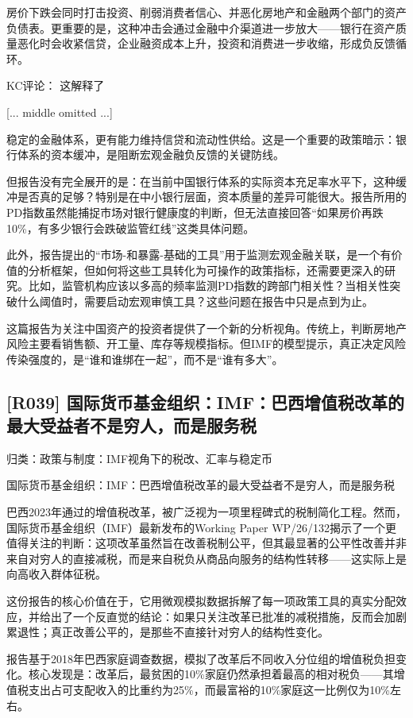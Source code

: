 \documentclass[11pt]{ctexart}
\begin{document}
房价下跌会同时打击投资、削弱消费者信心、并恶化房地产和金融两个部门的资产负债表。更重要的是，这种冲击会通过金融中介渠道进一步放大——银行在资产质量恶化时会收紧信贷，企业融资成本上升，投资和消费进一步收缩，形成负反馈循环。

KC评论： 这解释了

[... middle omitted ...]

稳定的金融体系，更有能力维持信贷和流动性供给。这是一个重要的政策暗示：银行体系的资本缓冲，是阻断宏观金融负反馈的关键防线。

但报告没有完全展开的是：在当前中国银行体系的实际资本充足率水平下，这种缓冲是否真的足够？特别是在中小银行层面，资本质量的差异可能很大。报告所用的PD指数虽然能捕捉市场对银行健康度的判断，但无法直接回答“如果房价再跌10\%，有多少银行会跌破监管红线”这类具体问题。

此外，报告提出的“市场-和暴露-基础的工具”用于监测宏观金融关联，是一个有价值的分析框架，但如何将这些工具转化为可操作的政策指标，还需要更深入的研究。比如，监管机构应该以多高的频率监测PD指数的跨部门相关性？当相关性突破什么阈值时，需要启动宏观审慎工具？这些问题在报告中只是点到为止。

这篇报告为关注中国资产的投资者提供了一个新的分析视角。传统上，判断房地产风险主要看销售额、开工量、库存等规模指标。但IMF的模型提示，真正决定风险传染强度的，是“谁和谁绑在一起”，而不是“谁有多大”。

\subsection{[R039] 国际货币基金组织：IMF：巴西增值税改革的最大受益者不是穷人，而是服务税}
{\small\color{refgray}归类：政策与制度：IMF视角下的税改、汇率与稳定币}

国际货币基金组织：IMF：巴西增值税改革的最大受益者不是穷人，而是服务税

巴西2023年通过的增值税改革，被广泛视为一项里程碑式的税制简化工程。然而，国际货币基金组织（IMF）最新发布的Working Paper WP/26/132揭示了一个更值得关注的判断：这项改革虽然旨在改善税制公平，但其最显著的公平性改善并非来自对穷人的直接减税，而是来自税负从商品向服务的结构性转移——这实际上是向高收入群体征税。

这份报告的核心价值在于，它用微观模拟数据拆解了每一项政策工具的真实分配效应，并给出了一个反直觉的结论：如果只关注改革已批准的减税措施，反而会加剧累退性；真正改善公平的，是那些不直接针对穷人的结构性变化。

报告基于2018年巴西家庭调查数据，模拟了改革后不同收入分位组的增值税负担变化。核心发现是：改革后，最贫困的10\%家庭仍然承担着最高的相对税负——其增值税支出占可支配收入的比重约为25\%，而最富裕的10\%家庭这一比例仅为10\%左右。
\end{document}

